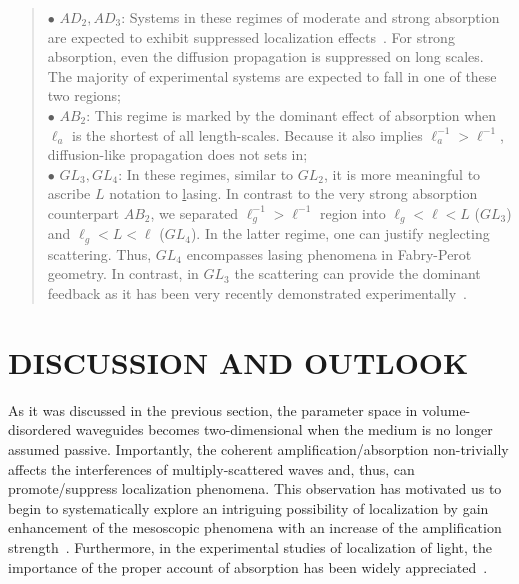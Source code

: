 \begin{quote}
$\bullet$ $AD_2,AD_3$: Systems in these regimes of moderate and strong absorption are expected to exhibit suppressed localization effects~\cite{1998_Brouwer}. For strong absorption, even the diffusion propagation is suppressed on long scales. The majority of experimental systems are expected to fall in one of these two regions;\\
$\bullet$ $AB_2$: This regime is marked by the dominant effect of absorption when $\ell_a$ is the shortest of all length-scales. Because it also implies $\ell_a^{-1}>\ell^{-1}$, diffusion-like propagation does not sets in;\\
$\bullet$ $GL_3,GL_4$: In these regimes, similar to $GL_2$, it is more meaningful to ascribe $L$ notation to {\underline l}asing. In contrast to the very strong absorption counterpart $AB_2$, we separated $\ell_g^{-1}>\ell^{-1}$ region into $\ell_g<\ell<L$ ($GL_3$) and $\ell_g<L<\ell$ ($GL_4$). In the latter regime, one can justify neglecting scattering. Thus, $GL_4$ encompasses lasing phenomena in Fabry-Perot geometry. In contrast, in $GL_3$ the scattering can provide the dominant feedback as it has been very recently demonstrated experimentally~\cite{2006_Wu,2006_Wu_spie}.\\
\end{quote}

\section{DISCUSSION AND OUTLOOK}
\label{sec:discussion_regimes}

As it was discussed in the previous section, the parameter space in volume-disordered waveguides becomes two-dimensional when the medium is no longer assumed passive. Importantly, the coherent amplification/absorption non-trivially affects the interferences of multiply-scattered waves and, thus, can promote/suppress localization phenomena. This observation has motivated us to begin to systematically explore an intriguing possibility of localization by gain enhancement of the mesoscopic phenomena with an increase of the amplification strength~\cite{1995_zyuzin_fluctuations,1997_Burkov_Zyuzin,2004_Yamilov_intensity,2005_Yamilov_correlations,2006_Yamilov_conductance,2010_Payne_loc_criterion,2010_Payne_TE}. Furthermore, in the experimental studies of localization of light, the importance of the proper account of absorption has been widely appreciated~\cite{1991_Genack,1997_wiersma_nature,1999_Maret,2000_chabanov_nature,2006_Maret}. 

